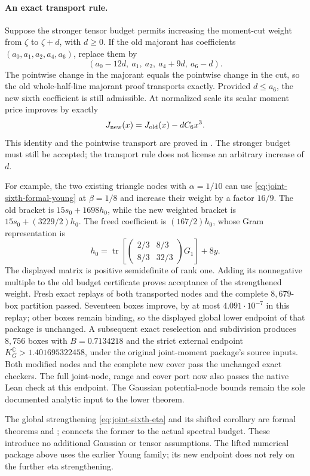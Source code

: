 \paragraph{An exact transport rule.}
Suppose the stronger tensor budget permits increasing the moment-cut weight
from $\zeta$ to $\zeta+d$, with $d\ge0$. If the old majorant has coefficients
$(a_0,a_1,a_2,a_4,a_6)$, replace them by
\[
 (a_0-12d,\ a_1,\ a_2,\ a_4+9d,\ a_6-d).
\]
The pointwise change in the majorant equals the pointwise change in the cut,
so the old whole-half-line majorant proof transports exactly. Provided
$d\le a_6$, the new sixth coefficient is still admissible. At normalized
scale its scalar moment price improves by exactly
\[
 J_{\rm new}(x)=J_{\rm old}(x)-dC_6x^3.
\]
This identity and the pointwise transport are proved in
. The stronger budget must still be
accepted; the transport rule does not license an arbitrary increase of $d$.

For example, the two existing triangle nodes with $\alpha=1/10$ can use
\eqref{eq:joint-sixth-formal-young} at $\beta=1/8$ and increase their weight
by a factor $16/9$. The old bracket is $15s_0+1698h_0$, while the new
weighted bracket is $15s_0+(3229/2)h_0$. The freed coefficient is
$(167/2)h_0$, whose Gram representation is
\[
 h_0=\operatorname{tr}\!\left[
 \begin{pmatrix}2/3&8/3\\8/3&32/3\end{pmatrix}G_1\right]+8y.
\]
The displayed matrix is positive semidefinite of rank one. Adding its
nonnegative multiple to the old budget certificate proves acceptance of
the strengthened weight. Fresh exact replays of both transported nodes
and the complete $8{,}679$-box partition passed. Seventeen boxes improve,
by at most $4.091\cdot10^{-7}$ in this replay; other boxes remain binding,
so the displayed global lower endpoint of that package is unchanged.
A subsequent exact reselection and subdivision produces $8{,}756$ boxes with
$B=0.7134218$ and the strict external endpoint
$K_G^{\mathbb C}>1.401695322458$, under the original joint-moment package's
source inputs. Both modified nodes and the complete new cover pass the unchanged
exact checkers. The full joint-node, range and cover port now also passes
the native Lean check at this endpoint. The Gaussian potential-node bounds
remain the sole documented analytic input to the lower theorem.

The global strengthening \eqref{eq:joint-sixth-eta} and its shifted corollary
are formal theorems  and
;  connects the
former to the actual spectral budget. These introduce no additional Gaussian or
tensor assumptions. The lifted numerical package above uses the earlier Young
family; its new endpoint does not rely on the further eta strengthening.

